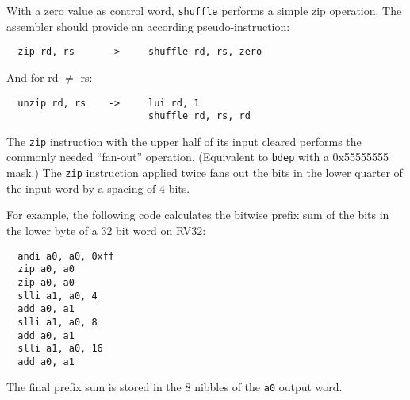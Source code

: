 With a zero value as control word, {\tt shuffle} performs a simple zip
operation. The assembler should provide an according pseudo-instruction:

\begin{verbatim}
  zip rd, rs      ->     shuffle rd, rs, zero
\end{verbatim}

And for rd $\neq$ rs:

\begin{verbatim}
  unzip rd, rs    ->     lui rd, 1
                         shuffle rd, rs, rd
\end{verbatim}

The \texttt{zip} instruction with the upper half of its input cleared performs
the commonly needed ``fan-out'' operation. (Equivalent to {\tt bdep} with a
0x55555555 mask.) The \texttt{zip} instruction applied twice fans out the bits
in the lower quarter of the input word by a spacing of 4 bits.

For example, the following code calculates the bitwise prefix sum of the bits
in the lower byte of a 32 bit word on RV32:

\begin{verbatim}
  andi a0, a0, 0xff
  zip a0, a0
  zip a0, a0
  slli a1, a0, 4
  add a0, a1
  slli a1, a0, 8
  add a0, a1
  slli a1, a0, 16
  add a0, a1
\end{verbatim}

The final prefix sum is stored in the 8 nibbles of the {\tt a0} output word.
